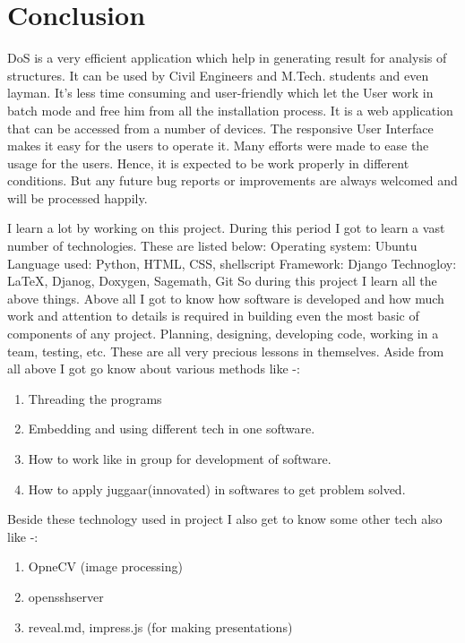 \section{Conclusion}
DoS is a very efficient application which help in generating result for analysis of structures. It
can be used by Civil Engineers and M.Tech. students and even layman. It's less time consuming and user-friendly which let the User work in batch mode 
and free him from all the installation process. It is a web application that can be accessed from a number of devices. The responsive User Interface makes it easy for the users to operate it. Many efforts were made to ease the usage for the users. Hence, it is expected to be work properly in different conditions. But any future bug reports or improvements are always welcomed and will be processed happily.

I learn a lot by working on this project. During this period I got to learn a vast number of
technologies. These are listed below:
Operating system: Ubuntu
Language used: Python, HTML, CSS, shellscript
Framework: Django
Technogloy: \LaTeX{}, Djanog, Doxygen, Sagemath, Git 
So during this project I learn  all the above things. Above all I got to know how software is
developed and how much work and attention to details is required in building even the most basic
of components of any project. Planning, designing, developing code, working in a team, testing,
etc. These are all very precious lessons in themselves.
Aside from all above I got go know about various methods like -:
\begin{enumerate}
\item Threading the programs 
\item Embedding and using different tech in one software.
\item How to work like in group for development of software.
\item How to apply juggaar(innovated) in softwares to get problem solved. 
\end{enumerate}

Beside these technology used in project I also get to know some other tech also like -:
\begin{enumerate}
\item  OpneCV (image processing)
\item opensshserver 
\item reveal.md, impress.js (for making presentations)
\end{enumerate}  


